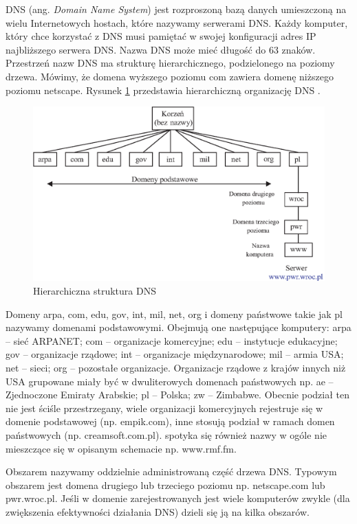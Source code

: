 DNS (ang. \emph{Domain Name System}) jest rozproszoną bazą danych umieszczoną na wielu Internetowych hostach, 
które nazywamy serwerami DNS. Każdy komputer, który chce korzystać z DNS musi pamiętać w swojej konfiguracji 
adres IP najbliższego serwera DNS. Nazwa DNS może mieć długość do 63 znaków. Przestrzeń nazw DNS ma strukturę 
hierarchicznego, podzielonego na poziomy drzewa. Mówimy, że domena wyższego poziomu com zawiera domenę niższego 
poziomu netscape. Rysunek \ref{dns} przedstawia hierarchiczną organizację DNS \cite{barylo3}.
\begin{figure}[h]
\centering
\includegraphics[width=5in]{./rysunki/struktura_dns.eps}
\caption{Hierarchiczna struktura DNS}
\label{dns}
\end{figure}
																
Domeny arpa, com, edu, gov, int, mil, net, org i domeny państwowe takie jak pl nazywamy domenami podstawowymi. 
Obejmują one następujące komputery: arpa -- sieć ARPANET; com -- organizacje komercyjne; edu -- instytucje edukacyjne; 
gov -- organizacje rządowe; int -- organizacje międzynarodowe; mil -- armia USA; net -- sieci; org -- pozostałe 
organizacje. Organizacje rządowe z krajów innych niż USA grupowane miały być w dwuliterowych domenach państwowych
np. ae -- Zjednoczone Emiraty Arabskie; pl -- Polska; zw -- Zimbabwe. Obecnie podział ten nie jest ściśle 
przestrzegany, wiele organizacji komercyjnych rejestruje się w domenie podstawowej (np. empik.com), inne stosują 
podział w ramach domen państwowych (np. creamsoft.com.pl). spotyka się również nazwy w ogóle nie mieszczące się 
w opisanym schemacie np. www.rmf.fm.

Obszarem nazywamy oddzielnie administrowaną część drzewa DNS. Typowym obszarem jest domena drugiego lub 
trzeciego poziomu  np. netscape.com lub pwr.wroc.pl. Jeśli w domenie zarejestrowanych jest wiele komputerów 
zwykle (dla zwiększenia efektywności działania DNS) dzieli się ją na kilka obszarów.


